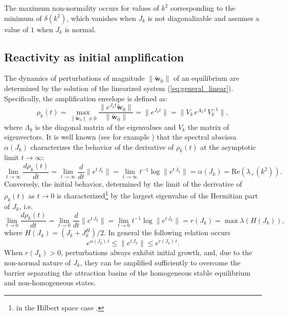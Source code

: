 \documentclass{article}
\newcommand{\jac}{J_{k}}
\begin{document}
The maximum non-normality occurs for values of $k^2$ corresponding to the minimum of $\delta(k^2)$, which vanishes when $\jac$ is not diagonalizable and assumes a value of $1$ when $\jac$ is normal.

\subsection{Reactivity as initial amplification}
\label{sec:react_in}
 The dynamics of perturbations of magnitude \( \|\widetilde{\mathbf{w}}_0\| \) of an equilibrium {are} determined by the solution of the linearized system (\ref{eq:general_linear}). Specifically, the amplification envelope is defined as:
\[
\rho_{k}(t) = \displaystyle \max_{\|\widetilde{\mathbf{w}}_0\|\neq 0} \frac{\|e^{\jac t} \widetilde{\mathbf{w}}_0 \|}{\|\widetilde{\mathbf{w}}_0\|} = \|e^{\jac t}\|=\|V_k\, e^{\Lambda_k\, t} \, V_{k}^{-1}\|,
\]
where $\Lambda_{k}$ is the diagonal matrix of the eigenvalues {and $V_{k}$ the matrix of eigenvectors}. 
It is well known (see for example \cite{trefethen2005spectra}) that the spectral abscissa \( \alpha(\jac) \) characterizes the behavior of the derivative of \( \rho_{k}(t) \) at the asymptotic limit \( t \to \infty \):
\[
\lim_{t \to \infty} \frac{d \rho_{k}(t)}{dt} = \lim_{t \to \infty } \frac{d}{dt} \| e^{t\, \jac} \| = \lim_{t \to \infty} t^{-1} \log \| e^{t\, \jac} \| = \alpha(\jac)=\mathrm{Re}(\lambda_+({k^2})).
\]
{ Conversely, the initial behavior, determined by the limit of the derivative of \( \rho_{k}(t) \) as \( t \to 0 \) is characterized\footnote{in the Hilbert space case \cite[Eq.~(14.2), p.~137]{trefethen2005spectra}.} by the largest eigenvalue of the Hermitian part of $\jac$, i.e.  \
\[
\lim_{t \to 0} \frac{d \rho_{k}(t)}{dt} = \lim_{t \to 0 } \frac{d}{dt} \| e^{t\, \jac} \| = \lim_{t \to 0} t^{-1} \log \| e^{t \, \jac} \| = r(\jac)
 = \max \lambda(H(\jac)),
 \]
 where $H(\jac) {= (\jac + \jac^H)/2}$. }
In general the following relation occurs
$$
e^{\alpha(\jac)\,t} \leq \|e^{t\, \jac} \| \leq e^{r(\jac)\,t}.
$$
 When \( r(\jac) > 0 \), perturbations always exhibit initial growth, and, due to the non-normal nature of \(\jac\), they can be amplified sufficiently to overcome the barrier separating the attraction basins of the homogeneous stable equilibrium and non-homogeneous states. 
\end{document}
